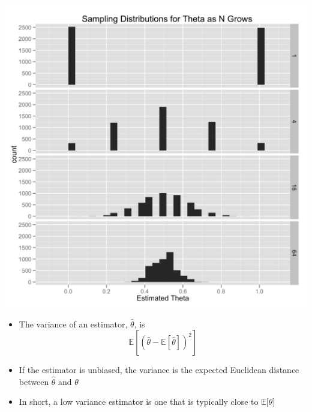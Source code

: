 \documentclass{beamer}
\begin{document}
\frame
{
  \begin{center}
    \includegraphics[scale = 0.1]{sampling_distribution.png}
  \end{center}
}

\frame
{
  \begin{itemize}
    \item{The variance of an estimator, $\hat{\theta}$, is}
    \[
    \mathbb{E}[(\hat{\theta} - \mathbb{E}[\hat{\theta}]) ^ 2]
    \]
   \item{If the estimator is unbiased, the variance is the expected Euclidean distance between $\hat{\theta}$ and $\theta$}
   \item{In short, a low variance estimator is one that is typically close to $\mathbb{E}[\theta$]}
  \end{itemize}
}
\end{document}
